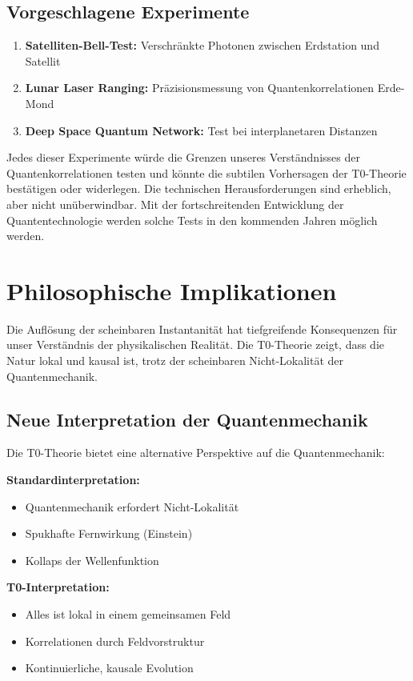 \documentclass[12pt,a4paper]{article}
\begin{document}
	\subsection{Vorgeschlagene Experimente}
	
	\begin{enumerate}
		\item \textbf{Satelliten-Bell-Test:} Verschränkte Photonen zwischen Erdstation und Satellit
		\item \textbf{Lunar Laser Ranging:} Präzisionsmessung von Quantenkorrelationen Erde-Mond
		\item \textbf{Deep Space Quantum Network:} Test bei interplanetaren Distanzen
	\end{enumerate}
	
	Jedes dieser Experimente würde die Grenzen unseres Verständnisses der Quantenkorrelationen testen und könnte die subtilen Vorhersagen der T0-Theorie bestätigen oder widerlegen. Die technischen Herausforderungen sind erheblich, aber nicht unüberwindbar. Mit der fortschreitenden Entwicklung der Quantentechnologie werden solche Tests in den kommenden Jahren möglich werden.
	
	\section{Philosophische Implikationen}
	
	Die Auflösung der scheinbaren Instantanität hat tiefgreifende Konsequenzen für unser Verständnis der physikalischen Realität. Die T0-Theorie zeigt, dass die Natur lokal und kausal ist, trotz der scheinbaren Nicht-Lokalität der Quantenmechanik.
	
	\subsection{Neue Interpretation der Quantenmechanik}
	
	Die T0-Theorie bietet eine alternative Perspektive auf die Quantenmechanik:
	
	\begin{tcolorbox}[colback=t0red!5!white, colframe=t0red!75!black, title=Neue Perspektive]
		\textbf{Standardinterpretation:}
		\begin{itemize}
			\item Quantenmechanik erfordert Nicht-Lokalität
			\item Spukhafte Fernwirkung (Einstein)
			\item Kollaps der Wellenfunktion
		\end{itemize}
		
		\textbf{T0-Interpretation:}
		\begin{itemize}
			\item Alles ist lokal in einem gemeinsamen Feld
			\item Korrelationen durch Feldvorstruktur
			\item Kontinuierliche, kausale Evolution
		\end{itemize}
	\end{tcolorbox}
	
\end{document}

